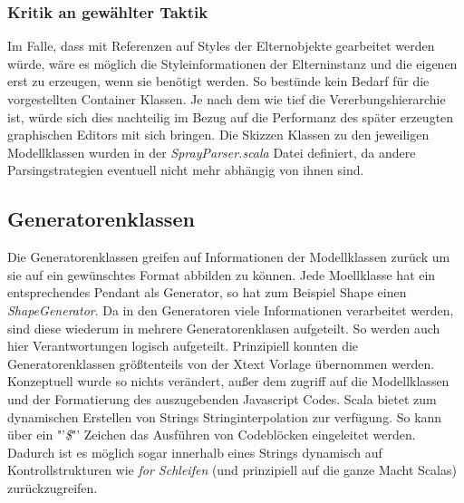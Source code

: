 \subsubsection{Kritik an gewählter Taktik}Im Falle, dass mit Referenzen auf Styles der Elternobjekte gearbeitet werden würde, wäre es möglich die Styleinformationen der Elterninstanz und die eigenen erst zu erzeugen, wenn sie benötigt werden. So bestünde kein Bedarf für die vorgestellten Container Klassen. Je nach dem wie tief die Vererbungshierarchie ist, würde sich dies nachteilig im Bezug auf die Performanz des später erzeugten graphischen Editors mit sich bringen. Die Skizzen Klassen zu den jeweiligen Modellklassen wurden in der \textit{SprayParser.scala} Datei definiert, da andere Parsingstrategien eventuell nicht mehr abhängig von ihnen sind.
\subsection{Generatorenklassen}
Die Generatorenklassen greifen auf Informationen der Modellklassen zurück um sie auf ein gewünschtes Format abbilden zu können. Jede Moellklasse hat ein entsprechendes Pendant als Generator, so hat zum Beispiel Shape einen \textit{ShapeGenerator}. Da in den Generatoren viele Informationen verarbeitet werden, sind diese wiederum in mehrere Generatorenklasen aufgeteilt. So werden auch hier Verantwortungen logisch aufgeteilt. Prinzipiell konnten die Generatorenklassen größtenteils von der Xtext Vorlage übernommen werden. Konzeptuell wurde so nichts verändert, außer dem zugriff auf die Modellklassen und der Formatierung des auszugebenden Javascript Codes. Scala bietet zum dynamischen Erstellen von Strings Stringinterpolation zur verfügung. So kann über ein "'\textit{\$}"' Zeichen das Ausführen von Codeblöcken eingeleitet werden. Dadurch ist es möglich sogar innerhalb eines Strings dynamisch auf Kontrollstrukturen wie \textit{for Schleifen} (und prinzipiell auf die ganze Macht Scalas) zurückzugreifen.
